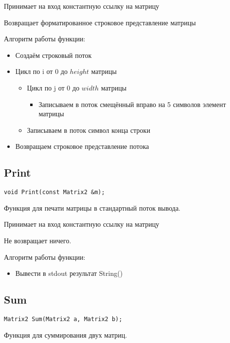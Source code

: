 Принимает на вход константную ссылку на матрицу

Возвращает форматированное строковое представление матрицы

Алгоритм работы функции:

\begin{itemize}
	\item Создаём строковый поток
	\item Цикл по i от 0 до $ height $ матрицы
	\begin{itemize}
		\item Цикл по j от 0 до $ width $ матрицы
		\begin{itemize}
			\item Записываем в поток смещённый вправо на 5 символов элемент матрицы
		\end{itemize}
		\item Записываем в поток символ конца строки
	\end{itemize}
	\item Возвращаем строковое представление потока
\end{itemize}

\subsection*{Print}

\begin{lstlisting}[label={lst:Print}]
	void Print(const Matrix2 &m);
\end{lstlisting}

Функция для печати матрицы в стандартный поток вывода.

Принимает на вход константную ссылку на матрицу

Не возвращает ничего.

Алгоритм работы функции:

\begin{itemize}
	\item Вывести в stdout результат String()
\end{itemize}

\subsection*{Sum}

\begin{lstlisting}[label={lst:Sum}]
	Matrix2 Sum(Matrix2 a, Matrix2 b);
\end{lstlisting}

Функция для суммирования двух матриц.

